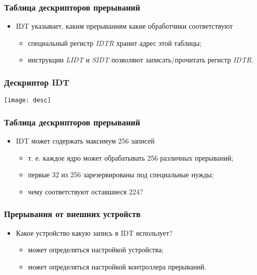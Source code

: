 \begin{frame}
\frametitle{Таблица дескрипторов прерываний}
\begin{itemize}
    \item<1-> IDT указывает, каким прерываниям какие обработчики соответствуют
    \begin{itemize}
        \item<2-> специальный регистр \emph{IDTR} хранит адрес этой таблицы;
        \item<3-> инструкции \emph{LIDT} и \emph{SIDT} позволяют
        записать/прочитать регистр \emph{IDTR}.
    \end{itemize}
\end{itemize}
\end{frame}

\begin{frame}
\frametitle{Дескриптор IDT}
    \hspace*{\fill}
    \texttt{[image: desc]}
    \hspace*{\fill}\hspace*{\fill}
\end{frame}

\begin{frame}
\frametitle{Таблица дескрипторов прерываний}
\begin{itemize}
    \item<1->IDT может содержать максимум 256 записей
    \begin{itemize}
        \item т. е. каждое ядро может обрабатывать 256 различных прерываний;
        \item<2-> первые 32 из 256 зарезервированы под специальные нужды;
        \item<3-> чему соответствуют оставшиеся 224?
    \end{itemize}
\end{itemize}
\end{frame}

\begin{frame}
\frametitle{Прерывания от внешних устройств}
\begin{itemize}
    \item<1->Какое устройство какую запись в IDT использует?
    \begin{itemize}
        \item<2->может определяться настройкой устройства;
        \item<3->может определяться настройкой контроллера прерываний.
    \end{itemize}
\end{itemize}
\end{frame}

